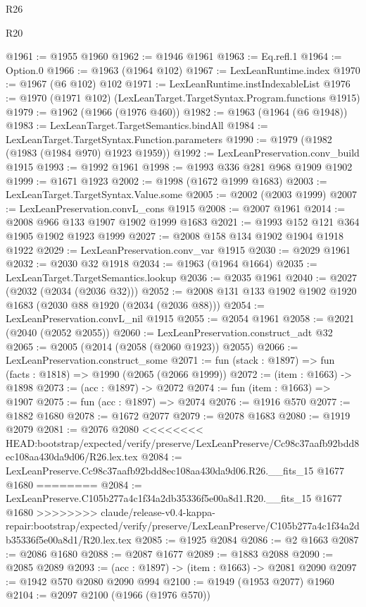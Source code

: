 \begin{lexlean}{R26}
\begin{lexlean}{R20}
\begin{coremodule}
{{{{{{{{{{{{{{{{{{{{{{{{{{{{{{{{{{{{{{{{{{{{{{{{{{{{{{{{{{{{{{{@1961 := @1955 @1960
@1962 := @1946 @1961
@1963 := Eq.refl.{1}
@1964 := Option.{0}
@1966 := @1963 (@1964 @102)
@1967 := LexLeanRuntime.index
@1970 := @1967 (@6 @102) @102
@1971 := LexLeanRuntime.instIndexableList
@1976 := @1970 (@1971 @102) (LexLeanTarget.TargetSyntax.Program.functions @1915)
@1979 := @1962 (@1966 (@1976 @460))
@1982 := @1963 (@1964 (@6 @1948))
@1983 := LexLeanTarget.TargetSemantics.bindAll
@1984 := LexLeanTarget.TargetSyntax.Function.parameters
@1990 := @1979 (@1982 (@1983 (@1984 @970) @1923 @1959))
@1992 := LexLeanPreservation.conv_build @1915
@1993 := @1992 @1961
@1998 := @1993 @336 @281 @968 @1909 @1902
@1999 := @1671 @1923
@2002 := @1998 (@1672 @1999 @1683)
@2003 := LexLeanTarget.TargetSyntax.Value.some
@2005 := @2002 (@2003 @1999)
@2007 := LexLeanPreservation.convL_cons @1915
@2008 := @2007 @1961
@2014 := @2008 @966 @133 @1907 @1902 @1999 @1683
@2021 := @1993 @152 @121 @364 @1905 @1902 @1923 @1999
@2027 := @2008 @158 @134 @1902 @1904 @1918 @1922
@2029 := LexLeanPreservation.conv_var @1915
@2030 := @2029 @1961
@2032 := @2030 @32 @1918
@2034 := @1963 (@1964 @1664)
@2035 := LexLeanTarget.TargetSemantics.lookup
@2036 := @2035 @1961
@2040 := @2027 (@2032 (@2034 (@2036 @32)))
@2052 := @2008 @131 @133 @1902 @1902 @1920 @1683 (@2030 @88 @1920 (@2034 (@2036 @88)))
@2054 := LexLeanPreservation.convL_nil @1915
@2055 := @2054 @1961
@2058 := @2021 (@2040 (@2052 @2055))
@2060 := LexLeanPreservation.construct_adt @32
@2065 := @2005 (@2014 (@2058 (@2060 @1923)) @2055)
@2066 := LexLeanPreservation.construct_some
@2071 := fun (stack : @1897) => fun (facts : @1818) => @1990 (@2065 (@2066 @1999))
@2072 := (item : @1663) -> @1898
@2073 := (acc : @1897) -> @2072
@2074 := fun (item : @1663) => @1907
@2075 := fun (acc : @1897) => @2074
@2076 := @1916 @570
@2077 := @1882 @1680
@2078 := @1672 @2077
@2079 := @2078 @1683
@2080 := @1919 @2079
@2081 := @2076 @2080
<<<<<<<< HEAD:bootstrap/expected/verify/preserve/LexLeanPreserve/Cc98c37aafb92bdd8ec108aa430da9d06/R26.lex.tex
@2084 := LexLeanPreserve.Cc98c37aafb92bdd8ec108aa430da9d06.R26.__fits_15 @1677 @1680
========
@2084 := LexLeanPreserve.C105b277a4c1f34a2db35336f5e00a8d1.R20.__fits_15 @1677 @1680
>>>>>>>> claude/release-v0.4-kappa-repair:bootstrap/expected/verify/preserve/LexLeanPreserve/C105b277a4c1f34a2db35336f5e00a8d1/R20.lex.tex
@2085 := @1925 @2084
@2086 := @2 @1663
@2087 := @2086 @1680
@2088 := @2087 @1677
@2089 := @1883 @2088
@2090 := @2085 @2089
@2093 := (acc : @1897) -> (item : @1663) -> @2081 @2090
@2097 := @1942 @570 @2080 @2090 @994
@2100 := @1949 (@1953 @2077) @1960
@2104 := @2097 @2100 (@1966 (@1976 @570))
}}}}}}}}}}}}}}}}}}}}}}}}}}}}}}}}}}}}}}}}}}}}}}}}}}}}}}}}}}}}}}}
\end{coremodule}
\end{lexlean}
\end{lexlean}
